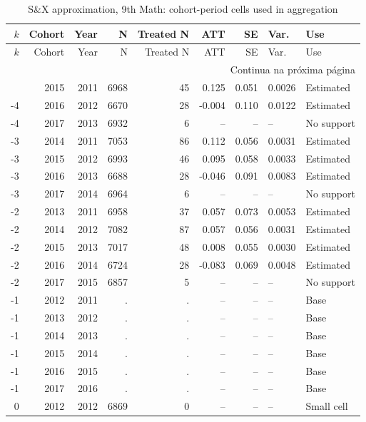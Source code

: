 ﻿\begingroup
\tiny
\setlength{\tabcolsep}{2.2pt}
\renewcommand{\arraystretch}{0.82}
\begin{longtable}{rrrrrrrll}
\caption{S\&X approximation, 9th Math: cohort-period cells used in aggregation}
\label{tab:ap_sx_celulas_9th_mat}\\
\toprule
\(k\) & Cohort & Year & N & Treated N & ATT & SE & Var. & Use \\
\midrule
\endfirsthead
\toprule
\(k\) & Cohort & Year & N & Treated N & ATT & SE & Var. & Use \\
\midrule
\endhead
\midrule
\multicolumn{9}{r}{Continua na próxima página} \\
\endfoot
\bottomrule
\endlastfoot
-4 & 2015 & 2011 & 6968 & 45 & 0.125 & 0.051 & 0.0026 & Estimated \\
-4 & 2016 & 2012 & 6670 & 28 & -0.004 & 0.110 & 0.0122 & Estimated \\
-4 & 2017 & 2013 & 6932 & 6 & -- & -- & -- & No support \\
-3 & 2014 & 2011 & 7053 & 86 & 0.112 & 0.056 & 0.0031 & Estimated \\
-3 & 2015 & 2012 & 6993 & 46 & 0.095 & 0.058 & 0.0033 & Estimated \\
-3 & 2016 & 2013 & 6688 & 28 & -0.046 & 0.091 & 0.0083 & Estimated \\
-3 & 2017 & 2014 & 6964 & 6 & -- & -- & -- & No support \\
-2 & 2013 & 2011 & 6958 & 37 & 0.057 & 0.073 & 0.0053 & Estimated \\
-2 & 2014 & 2012 & 7082 & 87 & 0.057 & 0.056 & 0.0031 & Estimated \\
-2 & 2015 & 2013 & 7017 & 48 & 0.008 & 0.055 & 0.0030 & Estimated \\
-2 & 2016 & 2014 & 6724 & 28 & -0.083 & 0.069 & 0.0048 & Estimated \\
-2 & 2017 & 2015 & 6857 & 5 & -- & -- & -- & No support \\
-1 & 2012 & 2011 & . & . & -- & -- & -- & Base \\
-1 & 2013 & 2012 & . & . & -- & -- & -- & Base \\
-1 & 2014 & 2013 & . & . & -- & -- & -- & Base \\
-1 & 2015 & 2014 & . & . & -- & -- & -- & Base \\
-1 & 2016 & 2015 & . & . & -- & -- & -- & Base \\
-1 & 2017 & 2016 & . & . & -- & -- & -- & Base \\
0 & 2012 & 2012 & 6869 & 0 & -- & -- & -- & Small cell \\

\end{longtable}
